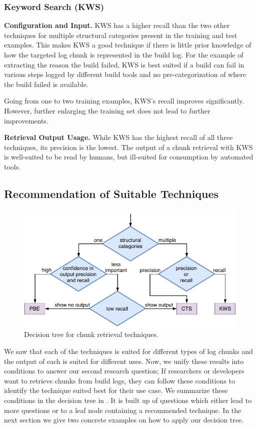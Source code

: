 \subsubsection{Keyword Search (KWS)}
\noindent
\textbf{Configuration and Input.}
KWS has a higher recall than the two other techniques for multiple
structural categories present in the training and test examples.
This
makes KWS a good technique if there is little prior knowledge of how
the targeted log chunk is represented in the build log.
For the
example of extracting the reason the build failed, KWS is best suited
if a build can fail in various steps logged by different build
tools and no
pre-categorization of where the build failed is available.

Going from one to two training examples, KWS's recall improves
significantly.
However, further enlarging the training set
does not lead to further improvements.

\noindent
\textbf{Retrieval Output Usage.}
While KWS has the highest recall of all three techniques, its
precision is the lowest.
The output of a chunk retrieval with KWS is
well-suited to be read by humans, but ill-suited for consumption by
automated tools.


\subsection{Recommendation of Suitable Techniques}

\begin{figure}[bt]
		\centering
		\includegraphics[width=\columnwidth,
		clip]{img/crt-recommendation.pdf}
		\caption{Decision tree for chunk
		retrieval techniques.}
		\label{fig:crt-recommendation}
\end{figure}

We saw that each of the techniques is suited for different types of
log chunks and the output of each is suited for different uses.
Now, we unify these results into conditions to answer
our second research question;
If researchers or developers want to retrieve chunks from build logs,
they can follow these conditions to identify the technique
suited best for their use case.
We summarize these conditions in the decision tree in
.
It is built up of questions
which either lead to more questions or to a leaf node containing a
recommended technique.
In the next section we give two concrete examples on how to
apply our decision tree.


